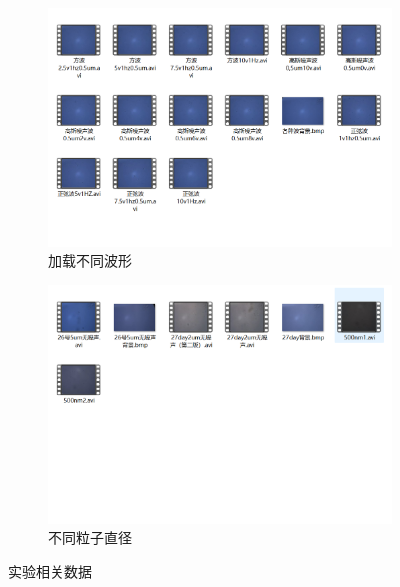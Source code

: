 \documentclass[a4paper]{report} %
\begin{document}
\begin{figure}[H]
    \begin{subfigure}{0.45\textwidth}
        \includegraphics[width=\linewidth]{不同波形.png}
        \caption{加载不同波形}
    \end{subfigure}
    \begin{subfigure}{0.45\textwidth}
        \includegraphics[width=\linewidth]{不同粒子直径.png}
        \caption{不同粒子直径}
    \end{subfigure}

    \caption{实验相关数据}
\end{figure}
\end{document}
